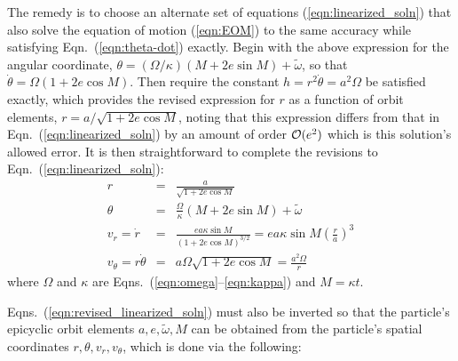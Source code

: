 \documentclass[preprint]{aastex62}
\begin{document}
The remedy is to choose an alternate set of equations (\ref{eqn:linearized_soln}) that also
solve the equation of motion (\ref{eqn:EOM}) to the same accuracy while  
satisfying Eqn.\ (\ref{eqn:theta-dot}) exactly. Begin with the above expression for the
angular coordinate, $\theta=(\Omega/\kappa)(M+2e\sin M) + \tilde{\omega}$,
so that $\dot{\theta} =\Omega(1+2e\cos M)$. Then require the constant $h=r^2\dot{\theta}=a^2\Omega$
be satisfied exactly, which provides the revised expression for $r$ as a function of orbit elements,
$r = a/\sqrt{1+2e\cos M}$, noting that this expression differs from that in Eqn.\ (\ref{eqn:linearized_soln}) 
by an amount of order ${\cal O}(e^2)$ which is this solution's allowed error.
It is then straightforward to complete the revisions to Eqn.\ (\ref{eqn:linearized_soln}):
\begin{eqnarray}
    \label{eqn:revised_linearized_soln}
    r &=& \frac{a}{\sqrt{1+2e\cos M}} \nonumber\\
    \theta &=& \frac{\Omega}{\kappa}(M+2e\sin M) + \tilde{\omega} \nonumber\\
    v_r = \dot{r} &=& \frac{ea\kappa\sin M}{(1 + 2e\cos M)^{3/2}}  = ea\kappa\sin M\left(\frac{r}{a}\right)^3\nonumber\\
    v_\theta = r\dot{\theta} &=& a\Omega\sqrt{1 + 2e\cos M} = \frac{a^2\Omega}{r}
\end{eqnarray}
where $\Omega$ and $\kappa$ are Eqns.\ (\ref{eqn:omega}--\ref{eqn:kappa}) and $M=\kappa t$.

Eqns.\ (\ref{eqn:revised_linearized_soln}) must also be inverted so
that the particle's epicyclic orbit elements $a, e, \tilde{\omega}, M$ can be obtained
from the particle's spatial coordinates $r, \theta, v_r, v_\theta$, which is done via
the following:
\end{document}
